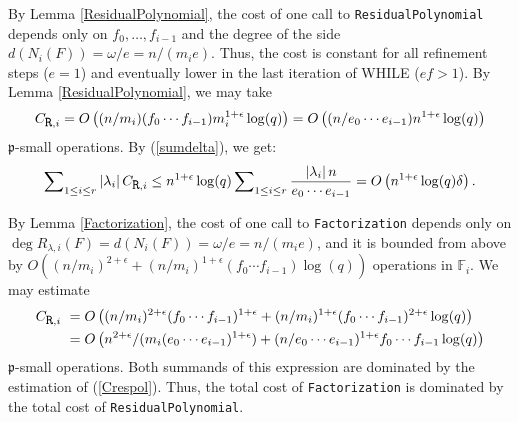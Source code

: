 \documentclass{amsart}
\begin{document}
By Lemma \ref{ResidualPolynomial}, the cost of one call to {\tt ResidualPolyno\-mial}  depends only on $f_0,\dots,f_{i-1}$ and the degree of the side $d(N_i(F))=\omega/e=n/(m_ie)$. Thus, the cost is constant for all refinement steps ($e=1$) and eventually lower in the last iteration of WHILE ($ef>1$). By Lemma \ref{ResidualPolynomial},  we may take 
\begin{equation}\label{Crespol}
C_{\mbox{\tt R},i}=O\left((n/m_i)(f_0\cdots f_{i-1})m_i^{1+\epsilon}\log(q)\right)=O\left((n/e_0\cdots e_{i-1})n^{1+\epsilon}\log(q)\right)
\end{equation}
${\mathfrak{p}}$-small operations. By (\ref{sumdelta}), we get:
$$
\sum\nolimits_{1\le i\le r}|\lambda_i|\,C_{\mbox{\tt R},i}\le
n^{1+\epsilon}\log(q)\sum\nolimits_{1\le i\le r}\dfrac{|\lambda_i|\,n}{e_0\cdots e_{i-1}}=O\left(n^{1+\epsilon}\log(q)\delta\right).
$$

By Lemma \ref{Factorization}, the cost of one call to {\tt Factorization}  depends only on $\deg R_{\lambda,i}(F)=d(N_i(F))=\omega/e=n/(m_ie)$, and it is bounded from above by $O\left((n/m_i)^{2+\epsilon}+(n/m_i)^{1+\epsilon}(f_0\cdots f_{i-1})\log(q)\right)$ operations in ${\mathbb F}_i$. We may estimate 
\begin{align*}
C_{\mbox{\tt R},i}&\ =O\left((n/m_i)^{2+\epsilon}(f_0\cdots f_{i-1})^{1+\epsilon}+(n/m_i)^{1+\epsilon}(f_0\cdots f_{i-1})^{2+\epsilon}\log(q)\right)\\
&\ =O\left(n^{2+\epsilon}/(m_i(e_0\cdots e_{i-1})^{1+\epsilon})+(n/e_0\cdots e_{i-1})^{1+\epsilon}f_0\cdots f_{i-1}\log(q)\right)
\end{align*}
${\mathfrak{p}}$-small operations. Both summands of this expression are dominated by the estimation of (\ref{Crespol}). Thus, the total cost of {\tt Factorization} is dominated by the total cost of {\tt ResidualPolynomial}.\medskip
\end{document}
